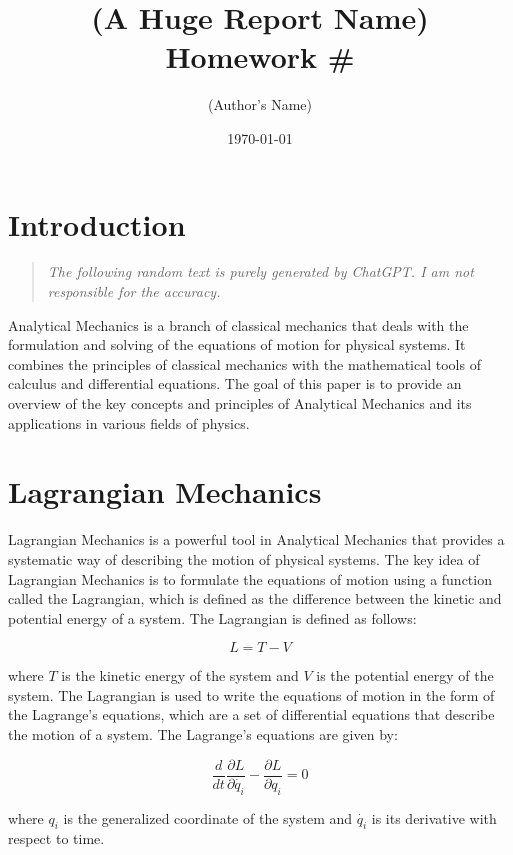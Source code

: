 \documentclass{breport}
\title{\textbf{(A Huge Report Name)}\\ Homework \#}
\author{(Author's Name)}
\date{\today}
\begin{document}
\maketitlepage


\section{Introduction}
\begin{quote}
  \textit{The following random text is purely generated by ChatGPT. I am not responsible for the accuracy.}
\end{quote}
Analytical Mechanics is a branch of classical mechanics that deals with the formulation and solving of the equations of motion for physical systems. It combines the principles of classical mechanics with the mathematical tools of calculus and differential equations. The goal of this paper is to provide an overview of the key concepts and principles of Analytical Mechanics and its applications in various fields of physics.

\section{Lagrangian Mechanics}
Lagrangian Mechanics is a powerful tool in Analytical Mechanics that provides a systematic way of describing the motion of physical systems. The key idea of Lagrangian Mechanics is to formulate the equations of motion using a function called the Lagrangian, which is defined as the difference between the kinetic and potential energy of a system. The Lagrangian is defined as follows:

\begin{equation}
L = T - V
\end{equation}

where $T$ is the kinetic energy of the system and $V$ is the potential energy of the system. The Lagrangian is used to write the equations of motion in the form of the Lagrange's equations, which are a set of differential equations that describe the motion of a system. The Lagrange's equations are given by:

\begin{equation}
\frac{d}{dt}\frac{\partial L}{\partial \dot{q_i}} - \frac{\partial L}{\partial q_i} = 0
\end{equation}

where $q_i$ is the generalized coordinate of the system and $\dot{q_i}$ is its derivative with respect to time.
\end{document}
